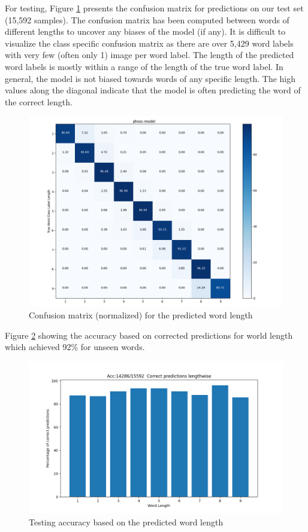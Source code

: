 For testing, Figure \ref{fig:confusion-matrix} presents the confusion matrix for predictions on our test set (15,592 samples). The confusion matrix has been computed between words of different lengths to uncover any biases of the model (if any). It is difficult to visualize the class specific confusion matrix as there are over 5,429 word labels with very few (often only 1) image per word label. The length of the predicted word labels is mostly within a range of the length of the true word label. In general, the model is not biased towards words of any specific length. The high values along the diagonal indicate that the model is often predicting the word of the correct length.

\begin{figure}[H]
    \centering
    \includegraphics[width=12cm]{images/confusion-matrix.png}
    \caption{Confusion matrix (normalized) for the predicted word length}
    \label{fig:confusion-matrix}
\end{figure}

Figure \ref{fig:test-accuracy} showing the accuracy based on corrected predictions for world length which achieved 92\% for unseen words.

\begin{figure}[H]
    \centering
    \includegraphics[width=12cm]{images/test-accuracy.png}
    \caption{Testing accuracy based on the predicted word length}
    \label{fig:test-accuracy}
\end{figure}

